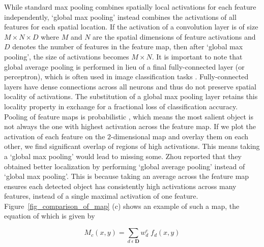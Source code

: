 While standard max pooling combines spatially local activations for each feature independently, `global max pooling' instead combines the activations of all features for each spatial location.  
If the activation of a convolution layer is of size $ M \times N \times D $ where $M$ and $N$ are the spatial dimensions of feature activations and $D$ denotes the number of features in the feature map, then after `global max pooling', the size of activations becomes $M \times N$.
It is important to note that global average pooling is performed in lieu of a final fully-connected layer (or perceptron), which is often used in image classification tasks \cite{Simonyan2014VeryDC}.
Fully-connected layers have dense connections across all neurons and thus do not preserve spatial locality of activations.
The substitution of a global max pooling layer retains this locality property in exchange for a fractional loss of classification accuracy\cite{oquab2015object}.
Pooling of feature maps is probabilistic \cite{li2015beyond}, which means the most salient object is not always the one with highest activation across the feature map. 
If we plot the activation of each feature on the $2$-dimensional map and overlay them on each other, we find significant overlap of regions of high activations.
This means taking a `global max pooling' would lead to missing some. 
Zhou \cite{zhou2015learning} reported that they obtained better localization by performing `global average pooling' instead of `global max pooling'. 
This is because taking an average across the feature map ensures each detected object has consistently high activations across many features, instead of a single maximal activation of one feature.
Figure~\ref{fig_comparison_of_map} (c) shows an example of such a map, the equation of which is given by

\begin{equation}
    M_c(x,y) = \sum_{d \; \epsilon \; \mathbf{D}} w^{c}_{d} \; f_d(x,y)
    \label{eqn_gap}
\end{equation}

